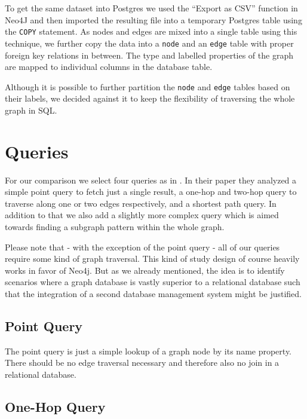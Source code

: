 \documentclass[11pt, a4paper,oneside,chapterprefix=false]{scrbook}
\begin{document}
To get the same dataset into Postgres we used the ``Export as CSV'' function in Neo4J and then imported the resulting file into a temporary Postgres table using the \lstinline{COPY} statement.
As nodes and edges are mixed into a single table using this technique, we further copy the data into a \lstinline{node} and an \lstinline{edge} table with proper foreign key relations in between.
The type and labelled properties of the graph are mapped to individual columns in the database table.

Although it is possible to further partition the \lstinline{node} and \lstinline{edge} tables based on their labels, we decided against it to keep the flexibility of traversing the whole graph in SQL.

\section{Queries} \label{sec:benchmark}

For our comparison we select four queries as in \cite{graphdbbenchmark}.
In their paper they analyzed a simple point query to fetch just a single result, a one-hop and two-hop query to traverse along one or two edges respectively, and a shortest path query.
In addition to that we also add a slightly more complex query which is aimed towards finding a subgraph pattern within the whole graph.

Please note that - with the exception of the point query - all of our queries require some kind of graph traversal.
This kind of study design of course heavily works in favor of Neo4j.
But as we already mentioned, the idea is to identify scenarios where a graph database is vastly superior to a relational database such that the integration of a second database management system might be justified.

\subsection{Point Query}

The point query is just a simple lookup of a graph node by its name property.
There should be no edge traversal necessary and therefore also no join in a relational database.

\subsection{One-Hop Query}
\end{document}
